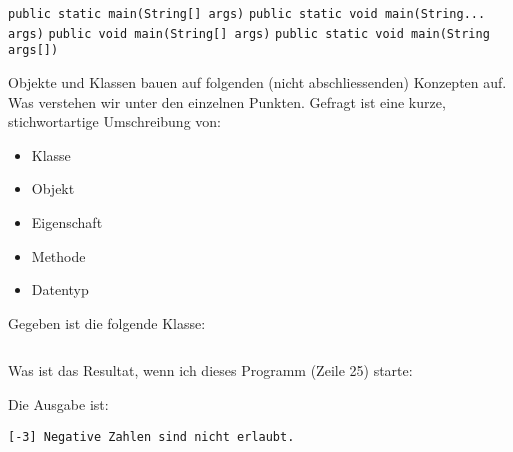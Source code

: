 \documentclass[12pt,a4paper]{exam}
\begin{document}
\begin{questions}
        \begin{checkboxes}
            \choice \texttt{public static main(String[] args)}
            \CorrectChoice \texttt{public static void main(String... args)}
            \choice \texttt{public void main(String[] args)}
            \CorrectChoice \texttt{public static void main(String args[])}
        \end{checkboxes}

        \addpoints

        \question[10]
        Objekte und Klassen bauen auf folgenden (nicht abschliessenden) Konzepten auf.
        Was verstehen wir unter den einzelnen Punkten. Gefragt ist eine kurze, stichwortartige
        Umschreibung von:
        \begin{itemize}
            \item Klasse
            \item Objekt
            \item Eigenschaft
            \item Methode
            \item Datentyp
        \end{itemize}
        \makeemptybox{\fill}

        \newpage
        \question[10]
        Gegeben ist die folgende Klasse:
        \inputminted[autogobble,linenos]{java}{../java/academy/calculator/InputValidator.java}

        Was ist das Resultat, wenn ich dieses Programm (Zeile 25) starte:

        \ifprintanswers
        \begin{solution}
            Die Ausgabe ist:

            \texttt{[-3] Negative Zahlen sind nicht erlaubt.}
        \end{solution}
        \else\makeemptybox{\fill}
        \fi

    \end{questions}
\end{document}
